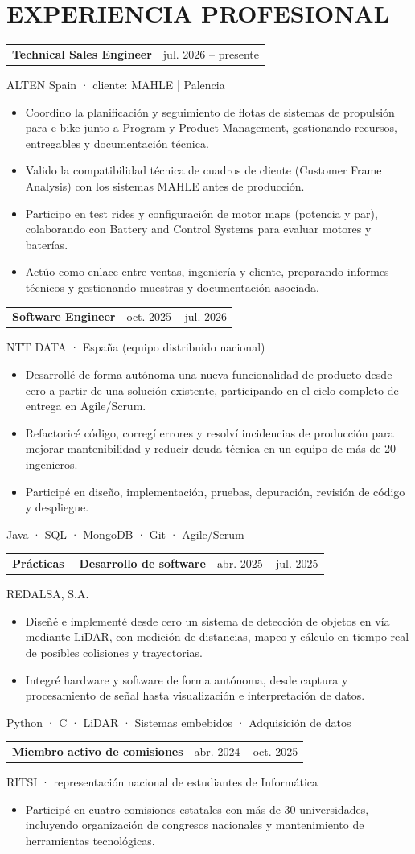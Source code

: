 \documentclass[10pt,a4paper]{article}
\makeatletter
\newcommand{\entry}[3]{\noindent\begin{tabularx}{\linewidth}{@{}Xr@{}}\textbf{#1}&{\small\color{muted}#2}\end{tabularx}\par{\small\color{muted}#3}\par}
\makeatother
\begin{document}
\section*{EXPERIENCIA PROFESIONAL}
\entry{Technical Sales Engineer}{jul. 2026 -- presente}{ALTEN Spain · cliente: MAHLE | Palencia}
\begin{itemize}
\item Coordino la planificación y seguimiento de flotas de sistemas de propulsión para e-bike junto a Program y Product Management, gestionando recursos, entregables y documentación técnica.
\item Valido la compatibilidad técnica de cuadros de cliente (Customer Frame Analysis) con los sistemas MAHLE antes de producción.
\item Participo en test rides y configuración de motor maps (potencia y par), colaborando con Battery and Control Systems para evaluar motores y baterías.
\item Actúo como enlace entre ventas, ingeniería y cliente, preparando informes técnicos y gestionando muestras y documentación asociada.
\end{itemize}
\entry{Software Engineer}{oct. 2025 -- jul. 2026}{NTT DATA · España (equipo distribuido nacional)}
\begin{itemize}
\item Desarrollé de forma autónoma una nueva funcionalidad de producto desde cero a partir de una solución existente, participando en el ciclo completo de entrega en Agile/Scrum.
\item Refactoricé código, corregí errores y resolví incidencias de producción para mejorar mantenibilidad y reducir deuda técnica en un equipo de más de 20 ingenieros.
\item Participé en diseño, implementación, pruebas, depuración, revisión de código y despliegue.
\end{itemize}
{\small\color{muted} Java · SQL · MongoDB · Git · Agile/Scrum}\par\vspace{4pt}
\entry{Prácticas -- Desarrollo de software}{abr. 2025 -- jul. 2025}{REDALSA, S.A.}
\begin{itemize}
\item Diseñé e implementé desde cero un sistema de detección de objetos en vía mediante LiDAR, con medición de distancias, mapeo y cálculo en tiempo real de posibles colisiones y trayectorias.
\item Integré hardware y software de forma autónoma, desde captura y procesamiento de señal hasta visualización e interpretación de datos.
\end{itemize}
{\small\color{muted} Python · C · LiDAR · Sistemas embebidos · Adquisición de datos}\par\vspace{4pt}
\entry{Miembro activo de comisiones}{abr. 2024 -- oct. 2025}{RITSI · representación nacional de estudiantes de Informática}
\begin{itemize}
\item Participé en cuatro comisiones estatales con más de 30 universidades, incluyendo organización de congresos nacionales y mantenimiento de herramientas tecnológicas.
\end{itemize}
\end{document}
